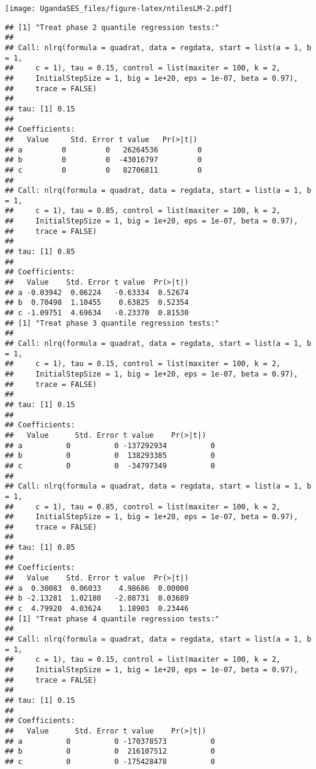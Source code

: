 \documentclass[
]{article}
\begin{document}
\texttt{[image: UgandaSES\_files/figure-latex/ntilesLM-2.pdf]}

\begin{verbatim}
## [1] "Treat phase 2 quantile regression tests:"
## 
## Call: nlrq(formula = quadrat, data = regdata, start = list(a = 1, b = 1, 
##     c = 1), tau = 0.15, control = list(maxiter = 100, k = 2, 
##     InitialStepSize = 1, big = 1e+20, eps = 1e-07, beta = 0.97), 
##     trace = FALSE)
## 
## tau: [1] 0.15
## 
## Coefficients:
##   Value     Std. Error t value   Pr(>|t|) 
## a         0         0   26264536         0
## b         0         0  -43016797         0
## c         0         0   82706811         0
## 
## Call: nlrq(formula = quadrat, data = regdata, start = list(a = 1, b = 1, 
##     c = 1), tau = 0.85, control = list(maxiter = 100, k = 2, 
##     InitialStepSize = 1, big = 1e+20, eps = 1e-07, beta = 0.97), 
##     trace = FALSE)
## 
## tau: [1] 0.85
## 
## Coefficients:
##   Value    Std. Error t value  Pr(>|t|)
## a -0.03942  0.06224   -0.63334  0.52674
## b  0.70498  1.10455    0.63825  0.52354
## c -1.09751  4.69634   -0.23370  0.81530
## [1] "Treat phase 3 quantile regression tests:"
## 
## Call: nlrq(formula = quadrat, data = regdata, start = list(a = 1, b = 1, 
##     c = 1), tau = 0.15, control = list(maxiter = 100, k = 2, 
##     InitialStepSize = 1, big = 1e+20, eps = 1e-07, beta = 0.97), 
##     trace = FALSE)
## 
## tau: [1] 0.15
## 
## Coefficients:
##   Value      Std. Error t value    Pr(>|t|)  
## a          0          0 -137292934          0
## b          0          0  138293385          0
## c          0          0  -34797349          0
## 
## Call: nlrq(formula = quadrat, data = regdata, start = list(a = 1, b = 1, 
##     c = 1), tau = 0.85, control = list(maxiter = 100, k = 2, 
##     InitialStepSize = 1, big = 1e+20, eps = 1e-07, beta = 0.97), 
##     trace = FALSE)
## 
## tau: [1] 0.85
## 
## Coefficients:
##   Value    Std. Error t value  Pr(>|t|)
## a  0.30083  0.06033    4.98686  0.00000
## b -2.13281  1.02180   -2.08731  0.03689
## c  4.79920  4.03624    1.18903  0.23446
## [1] "Treat phase 4 quantile regression tests:"
## 
## Call: nlrq(formula = quadrat, data = regdata, start = list(a = 1, b = 1, 
##     c = 1), tau = 0.15, control = list(maxiter = 100, k = 2, 
##     InitialStepSize = 1, big = 1e+20, eps = 1e-07, beta = 0.97), 
##     trace = FALSE)
## 
## tau: [1] 0.15
## 
## Coefficients:
##   Value      Std. Error t value    Pr(>|t|)  
## a          0          0 -170378573          0
## b          0          0  216107512          0
## c          0          0 -175428478          0

\end{verbatim}
\end{document}

